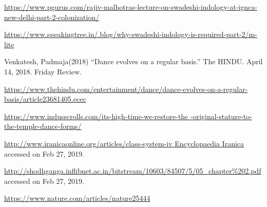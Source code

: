 \begin{thebibliography}{99}
  \url{https://www.pgurus.com/rajiv-malhotras-lecture-on-swadeshi-indology-at-ignca-new-delhi-part-2-colonization/}

  \url{https://www.speakingtree.in/.blog/why-swadeshi-indology-is-required-part-2/m-lite}

  Venkatesh, Padmaja(2018) “Dance evolves on a regular basis.” The HINDU. April 14, 2018. Friday Review.

  \url{https://www.thehindu.com/entertainment/dance/dance-evolves-on-a-regular-basis/article23681405.ecec}

  \url{https://www.indusscrolls.com/its-high-time-we-restore-the -original-stature-to-the-temple-dance-forms/}

  \url{http://www.iranicaonline.org/articles/class-system-iv Encyclopaedia Iranica} accessed on Feb 27, 2019.

  \url{http://shodhganga.inflibnet.ac.in/bitstream/10603/84507/5/05_chapter%202.pdf} accessed on Feb 27, 2019.

  \url{https://www.nature.com/articles/nature25444}

 \end{thebibliography}

